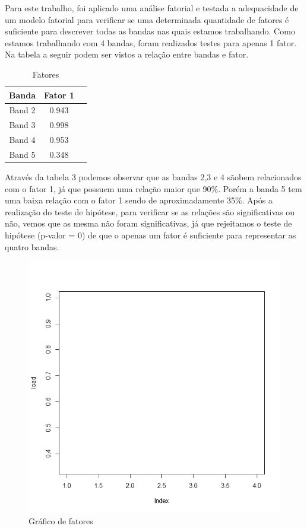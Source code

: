 \documentclass[a4paper,12pt]{article}
\begin{document}
Para este trabalho, foi aplicado uma análise fatorial e testada a adequacidade de um modelo fatorial para verificar se uma determinada quantidade de fatores é suficiente para descrever todas as bandas nas quais estamos trabalhando. Como estamos trabalhando com 4 bandas, foram realizados testes para apenas 1 fator. Na tabela a seguir podem ser vistos a relação entre bandas e fator.\\


\begin{table}[ht]
\centering
\caption{Fatores} \label{tab:exemplo}
\begin{tabular}{c c c}
\hline
 \textbf{Banda} & \textbf{Fator 1} \\
\hline 
Band 2 & 0.943 \\
Band 3 & 0.998 \\
Band 4 & 0.953 \\
Band 5 & 0.348 \\
\hline
\end{tabular}
\end{table}

Através da tabela 3 podemos observar que as bandas 2,3 e 4 sãobem relacionados com o fator 1, já que possuem uma relação maior que 90$\%$. Porém a banda 5 tem uma baixa relação com o fator 1 sendo de aproximadamente 35$\%$. Após a realização do teste de hipótese, para verificar se as relações são significativas ou não, vemos que as mesma não foram significativas, já que rejeitamos o teste de hipótese (p-valor = 0) de que o apenas um fator é suficiente para representar as quatro bandas.

\begin{center}
\begin{figure}[H]
    \centering
    \includegraphics[width = 0.9 \textwidth]{1fator.jpeg}
    \caption{Gráfico de fatores}
\end{figure}    
\end{center}
\end{document}
